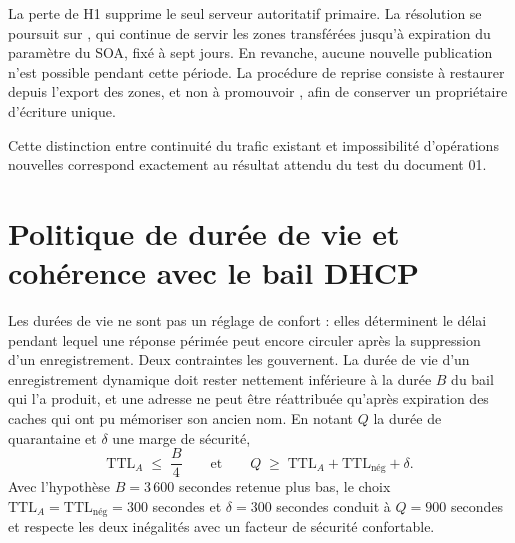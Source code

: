 \begin{encadredecision}
La perte de H1 supprime le seul serveur autoritatif primaire. La résolution se
poursuit sur , qui continue de servir les zones transférées jusqu'à
expiration du paramètre  du SOA, fixé à sept jours. En revanche,
aucune nouvelle publication n'est possible pendant cette période. La procédure
de reprise consiste à restaurer  depuis l'export des zones, et non à
promouvoir , afin de conserver un propriétaire d'écriture unique.

\smallskip
Cette distinction entre continuité du trafic existant et impossibilité
d'opérations nouvelles correspond exactement au résultat attendu du test
 du document 01.
\end{encadredecision}

\section{Politique de durée de vie et cohérence avec le bail DHCP}
\label{sec:ttl}

Les durées de vie ne sont pas un réglage de confort : elles déterminent le délai
pendant lequel une réponse périmée peut encore circuler après la suppression
d'un enregistrement. Deux contraintes les gouvernent. La durée de vie d'un
enregistrement dynamique doit rester nettement inférieure à la durée $B$ du bail
qui l'a produit, et une adresse ne peut être réattribuée qu'après expiration des
caches qui ont pu mémoriser son ancien nom. En notant $Q$ la durée de
quarantaine et $\delta$ une marge de sécurité,
\begin{equation}
  \mathrm{TTL}_A \;\leqslant\; \frac{B}{4}
  \qquad\text{et}\qquad
  Q \;\geqslant\; \mathrm{TTL}_A + \mathrm{TTL}_{\mathrm{nég}} + \delta .
  \label{eq:ttl}
\end{equation}
Avec l'hypothèse $B = 3\,600$ secondes retenue plus bas, le choix
$\mathrm{TTL}_A = \mathrm{TTL}_{\mathrm{nég}} = 300$ secondes et
$\delta = 300$ secondes conduit à $Q = 900$ secondes et respecte les deux
inégalités avec un facteur de sécurité confortable.

